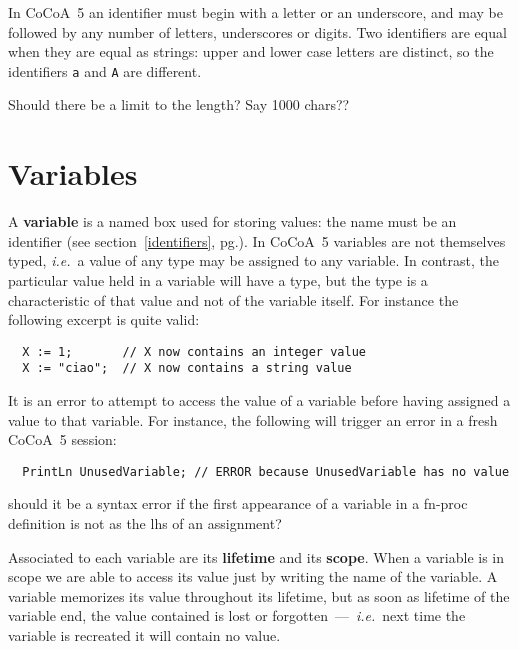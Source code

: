 \documentclass{book}[12,a4paper]
\def\ie{{\it i.e.}}
\def\refandpage#1{{\ref{#1}, pg.\pageref{#1}}}
\begin{document}
In CoCoA~5 an identifier must begin with a letter or an underscore, and may
be followed by any number of letters, underscores or digits.  Two
identifiers are equal when they are equal as strings: upper and lower case
letters are distinct, so the identifiers \texttt{a} and \texttt{A} are
different.

 Should there be a limit to the length?  Say 1000 chars??


\section{Variables}

A \textbf{variable} is a named box used for storing values: the name must be an
identifier (see section~\refandpage{identifiers}).  In CoCoA~5 variables are not
themselves typed, \ie~a value of any type may be assigned to any variable.
In contrast, the particular value held in a variable will have a type, but
the type is a characteristic of that value and not of the variable itself.
For instance the following excerpt is quite valid:
\begin{lstlisting}
  X := 1;       // X now contains an integer value
  X := "ciao";  // X now contains a string value
\end{lstlisting}

It is an error to attempt to access the value of a variable before having
assigned a value to that variable.  For instance, the following will trigger
an error in a fresh CoCoA~5 session:
\begin{lstlisting}
  PrintLn UnusedVariable; // ERROR because UnusedVariable has no value
\end{lstlisting}

 should it be a syntax error if the first appearance of
a variable in a fn-proc definition is not as the lhs of an assignment?

Associated to each variable are its \textbf{lifetime} and its
\textbf{scope}.  When a variable is in scope we are able to access its
value just by writing the name of the variable.  A variable memorizes its
value throughout its lifetime, but as soon as lifetime of the variable end,
the value contained is lost or forgotten~---~\ie~next time the variable is
recreated it will contain no value.
\end{document}
